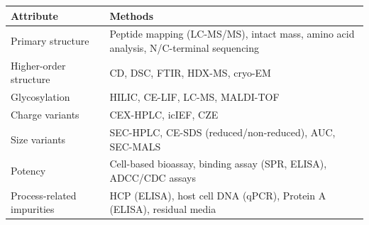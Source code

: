 \documentclass[
  11pt,
  a4paper,
]{report}
\begin{document}
\begin{longtable}[]{@{}ll@{}}
\toprule
\begin{minipage}[b]{0.52\columnwidth}\raggedright
Attribute\strut
\end{minipage} & \begin{minipage}[b]{0.42\columnwidth}\raggedright
Methods\strut
\end{minipage}\tabularnewline
\midrule
\endhead
\begin{minipage}[t]{0.52\columnwidth}\raggedright
Primary structure\strut
\end{minipage} & \begin{minipage}[t]{0.42\columnwidth}\raggedright
Peptide mapping (LC-MS/MS), intact mass, amino acid analysis,
N/C-terminal sequencing\strut
\end{minipage}\tabularnewline
\begin{minipage}[t]{0.52\columnwidth}\raggedright
Higher-order structure\strut
\end{minipage} & \begin{minipage}[t]{0.42\columnwidth}\raggedright
CD, DSC, FTIR, HDX-MS, cryo-EM\strut
\end{minipage}\tabularnewline
\begin{minipage}[t]{0.52\columnwidth}\raggedright
Glycosylation\strut
\end{minipage} & \begin{minipage}[t]{0.42\columnwidth}\raggedright
HILIC, CE-LIF, LC-MS, MALDI-TOF\strut
\end{minipage}\tabularnewline
\begin{minipage}[t]{0.52\columnwidth}\raggedright
Charge variants\strut
\end{minipage} & \begin{minipage}[t]{0.42\columnwidth}\raggedright
CEX-HPLC, icIEF, CZE\strut
\end{minipage}\tabularnewline
\begin{minipage}[t]{0.52\columnwidth}\raggedright
Size variants\strut
\end{minipage} & \begin{minipage}[t]{0.42\columnwidth}\raggedright
SEC-HPLC, CE-SDS (reduced/non-reduced), AUC, SEC-MALS\strut
\end{minipage}\tabularnewline
\begin{minipage}[t]{0.52\columnwidth}\raggedright
Potency\strut
\end{minipage} & \begin{minipage}[t]{0.42\columnwidth}\raggedright
Cell-based bioassay, binding assay (SPR, ELISA), ADCC/CDC assays\strut
\end{minipage}\tabularnewline
\begin{minipage}[t]{0.52\columnwidth}\raggedright
Process-related impurities\strut
\end{minipage} & \begin{minipage}[t]{0.42\columnwidth}\raggedright
HCP (ELISA), host cell DNA (qPCR), Protein A (ELISA), residual
media\strut
\end{minipage}\tabularnewline
\bottomrule
\end{longtable}
\end{document}
